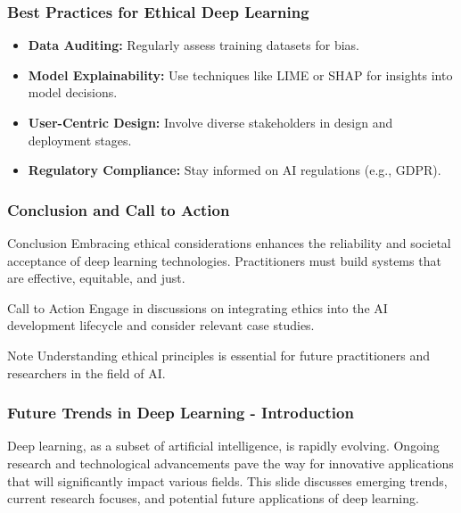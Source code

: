 \documentclass[aspectratio=169]{beamer}
\begin{document}
\begin{frame}[fragile]
    \frametitle{Best Practices for Ethical Deep Learning}
    \begin{itemize}
        \item \textbf{Data Auditing:} Regularly assess training datasets for bias.
        \item \textbf{Model Explainability:} Use techniques like LIME or SHAP for insights into model decisions.
        \item \textbf{User-Centric Design:} Involve diverse stakeholders in design and deployment stages.
        \item \textbf{Regulatory Compliance:} Stay informed on AI regulations (e.g., GDPR).
    \end{itemize}
\end{frame}

\begin{frame}[fragile]
    \frametitle{Conclusion and Call to Action}
    \begin{block}{Conclusion}
        Embracing ethical considerations enhances the reliability and societal acceptance of deep learning technologies. Practitioners must build systems that are effective, equitable, and just.
    \end{block}

    \begin{block}{Call to Action}
        Engage in discussions on integrating ethics into the AI development lifecycle and consider relevant case studies.
    \end{block}
    
    \begin{block}{Note}
        Understanding ethical principles is essential for future practitioners and researchers in the field of AI.
    \end{block}
\end{frame}

\begin{frame}[fragile]
    \frametitle{Future Trends in Deep Learning - Introduction}
    Deep learning, as a subset of artificial intelligence, is rapidly evolving. Ongoing research and technological advancements pave the way for innovative applications that will significantly impact various fields. This slide discusses emerging trends, current research focuses, and potential future applications of deep learning.
\end{frame}
\end{document}

